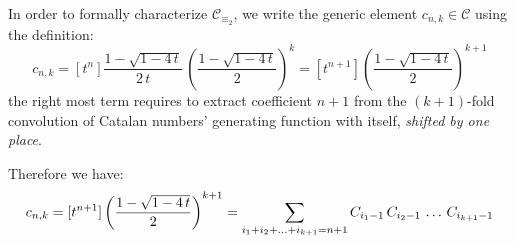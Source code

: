 In order to formally characterize $\mathcal{C}_{\equiv_{2}}$, 
we write the generic element $c_{n,k}\in\mathcal{C}$ using the definition:
\begin{displaymath}
    c_{n,k} = [t^n] \frac{1-\sqrt{1-4\,t}}{2\,t}\,
        \left(\frac{1-\sqrt{1-4\,t}}{2}\right)^{k}
           = [t^{n+1}] \left(\frac{1-\sqrt{1-4\,t}}{2}\right)^{k+1} 
\end{displaymath}
the right most term requires to extract coefficient $n+1$ from the $(k+1)$-fold
convolution of Catalan numbers' generating function with itself, \emph{shifted
by one place}. 
\iffalse
Before going on, careful understanding of what coefficients are introduced is necessary. 
The following expansion defines a sequence of coefficients 
$\lbrace \hat{c}_{i}\rbrace_{i\in\mathbb{N}}$:
\begin{displaymath}
    \frac{1-\sqrt{1-4\,t}}{2} = t + t^{2} + 2 t^{3} + 5 t^{4} 
        + 14 t^{5} + 42 t^{6} + 132 t^{7} %
        + \mathcal{O}\left(t^{8}\right)
\end{displaymath}
where $\hat{c}_{0}=0$. On the other hand the following one, defines a sequence 
of coefficients $\lbrace C_{i}\rbrace_{i\in\mathbb{N}}$, 
the traditional Catalan numbers:
\begin{displaymath}
    \frac{1-\sqrt{1-4\,t}}{2\,t} = 1 + t + 2 t^{2} + 5 t^{3} + 14 t^{4} 
        + 42 t^{5} + 132 t^{6} %
        + \mathcal{O}\left(t^{7}\right)
\end{displaymath}
so $\hat{c}_{j} = C_{j-1}$ holds for any $j\in\mathbb{N}$, 
with boundary condition $C_{-1}=0$.  Looking at the previous expression for $c_{n,k}$,
there exists indices $i_{1}, i_{2}, \ldots, i_{k+1}$,
where $i_{j}\in\lbrace0,\ldots,n+1\rbrace$ for each $j\in\lbrace1,\ldots,k+1\rbrace$, 
such that:
\fi
Therefore we have:
\begin{equation}
    \footnotesize
    c_{n,k} = [t^{n+1}] \left(\frac{1-\sqrt{1-4\,t}}{2}\right)^{k+1} 
            = \sum_{i_{1}+ i_{2}+ \ldots+ i_{k+1}=n+1}{
                C_{i_{1}-1}\,C_{i_{2}-1}\,\ldots\,C_{i_{k+1}-1} }
    \label{eq:convolution:expansion:for:generic:element:in:catalan:array}
\end{equation}


